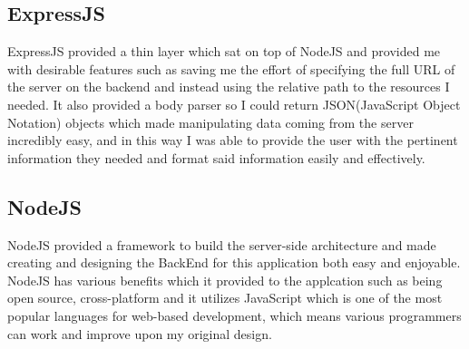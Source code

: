 \subsection{ExpressJS}
ExpressJS provided a thin layer which sat on top of NodeJS and provided me with desirable features such as saving me the effort of specifying the full URL of the server on the backend and instead using the relative path to the resources I needed.  It also provided a body parser so I could return JSON(JavaScript Object Notation) objects which made manipulating data coming from the server incredibly easy, and in this way I was able to provide the user with the pertinent information they needed and format said information easily and effectively.
\subsection{NodeJS}
NodeJS provided a framework to build the server-side architecture and made creating and designing the BackEnd for this application both easy and enjoyable.  NodeJS has various benefits which it provided to the applcation such as being open source, cross-platform and it utilizes JavaScript which is one of the most popular languages for web-based development, which means various programmers can work and improve upon my original design.
